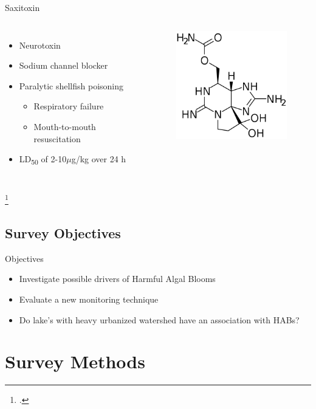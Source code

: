 \begin{frame}{Saxitoxin}
\begin{columns}
	\begin{itemize}
		\item Neurotoxin  
		\item Sodium channel blocker
		\item Paralytic shellfish poisoning
			\begin{itemize}
				\item Respiratory failure 
				\item Mouth-to-mouth resuscitation 
			\end{itemize}
		\item LD\textsubscript{50} of 2-10$\mu$g/kg over 24 h 
	\end{itemize}
	\begin{figure}
		\centering
		\includegraphics[width=2in]{saxitoxin.png}
	\end{figure}
\end{columns}
\footcitetext{saoudi_management_2017}
\end{frame}
\subsection{Survey Objectives}
\begin{frame}{Objectives}
	\begin{itemize}
		\item Investigate possible drivers of Harmful Algal Blooms 
		\item Evaluate a new monitoring technique
		\item Do lake's with heavy urbanized watershed have an association with HABs? 
	\end{itemize}
\end{frame}
\section{Survey Methods}
